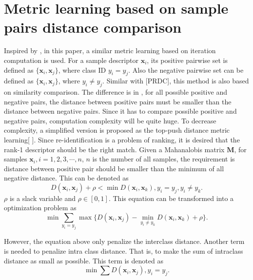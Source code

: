  \section{Metric learning based on sample pairs distance comparison}
 Inspired by \cite{TDL}, in this paper, a similar metric learning based on iteration computation is used. For a  sample descriptor $\bm{x}_i$,  its positive pairwise set is defined as $\{\bm{x}_i,\bm{x}_j\}$, where class ID $y_i = y_j$. Also the negative pairwise set can be defined as $\{\bm{x}_i,\bm{x}_j\}$, where $y_i \ne y_j$. Similar with [PRDC], this method is also based on similarity comparison. The difference is in \cite{PRDC}, for all possible positive and negative pairs, the distance between positive pairs must be smaller than the distance between negative pairs. Since it has to compare possible positive and negative pairs, computation complexity will be quite huge.  To decrease complexity, a simplified version is proposed as the top-push distance metric learning[ ].  Since re-identification is a problem of ranking, it is desired that the rank-1 descriptor should be the right match. Given a Mahanalobis matrix $\bm{M}$, for samples $\bm{x}_i, i = 1,2,3,\cdots,n$, $n$ is the number of all samples, the requirement is distance between positive pair should be smaller than the minimum of all negative distance. This can be denoted as 
 \begin{equation}
 D(\bm{x}_i,\bm{x}_j) + \rho < \min D(\bm{x}_i,\bm{x}_k), y_i = y_j, y_i\ne y_k.
 \end{equation}
 $\rho$ is a slack variable and $\rho \in [0,1]$. This equation can be transformed into a optimization problem as
 \begin{equation}
 \min \sum_{y_i = y_j} \max \{D(\bm{x}_i,\bm{x}_j) -  \min_{ y_i\ne y_k} D(\bm{x}_i,\bm{x}_k)  + \rho \}.
 \end{equation}
 
 However, the equation above only penalize the interclass distance. Another term is needed to penalize intra class distance. That is, to make the sum of intraclass distance as small as possible. This term is denoted as 
 \begin{equation}
 \min \sum D(\bm{x}_i,\bm{x}_j),y_i = y_j.
 \end{equation}
 
